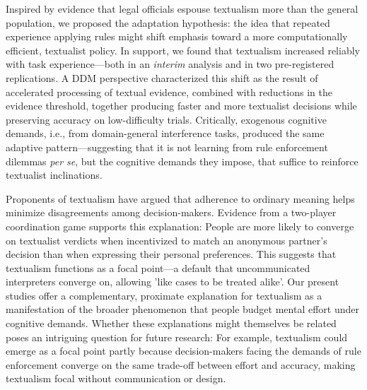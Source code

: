 \documentclass[pdflatex,sn-nature]{sn-jnl}
\begin{document}
Inspired by evidence that legal officials espouse textualism more than the general population\cite{ref8}, we proposed the adaptation hypothesis: the idea that repeated experience applying rules might shift emphasis toward a more computationally efficient, textualist policy. In support, we found that textualism increased reliably with task experience---both in an \textit{interim} analysis and in two pre-registered replications. A DDM perspective characterized this shift as the result of accelerated processing of textual evidence, combined with reductions in the evidence threshold, together producing faster and more textualist decisions while preserving accuracy on low-difficulty trials. Critically, exogenous cognitive demands, i.e., from domain-general interference tasks, produced the same adaptive pattern---suggesting that it is not learning from rule enforcement dilemmas \textit{per se}, but the cognitive demands they impose, that suffice to reinforce textualist inclinations\cite{ref37}.

Proponents of textualism have argued that adherence to  ordinary meaning helps minimize disagreements among decision-makers\cite{ref38,ref39}. Evidence from a two-player coordination game supports this explanation: People are more likely to converge on textualist verdicts when incentivized to match an anonymous partner's decision than when expressing their personal preferences\cite{ref8}. This suggests that textualism functions as a focal point\cite{ref40}---a default that uncommunicated interpreters converge on, allowing 'like cases to be treated alike'\cite{ref40,ref41}. Our present studies offer a complementary, proximate explanation for textualism as a manifestation of the broader phenomenon that people budget mental effort under cognitive demands. Whether these explanations might themselves be related poses an intriguing question for future research: For example, textualism could emerge as a focal point partly because decision-makers facing the demands of rule enforcement converge on the same trade-off between effort and accuracy, making textualism focal without communication or design.
\end{document}
